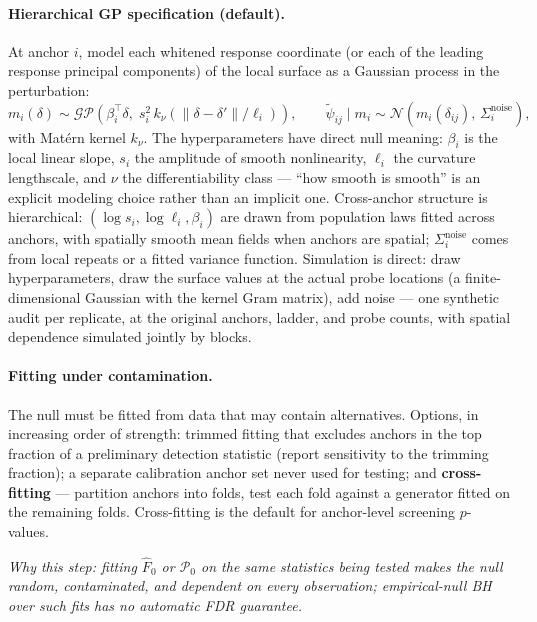 \documentclass[11pt]{article}
\newcommand{\nullgen}{\widehat{\mathcal P}_0}
\newcommand{\why}[1]{\par\noindent\textcolor{muted}{\small\itshape Why this step: #1}}
\begin{document}
\paragraph{Hierarchical GP specification (default).}
At anchor \(i\), model each whitened response coordinate (or each of the leading response
principal components) of the local surface as a Gaussian process in the perturbation:
\[
  m_i(\delta)\sim\mathcal{GP}\!\left(
    \beta_i^\top\delta,\;
    s_i^2\,k_\nu\!\left(\|\delta-\delta'\|/\ell_i\right)
  \right),
  \qquad
  \tilde\psi_{ij}\mid m_i \sim
  \mathcal N\!\left(m_i(\delta_{ij}),\,\Sigma_i^{\mathrm{noise}}\right),
\]
with Mat\'ern kernel \(k_\nu\). The hyperparameters have direct null meaning:
\(\beta_i\) is the local linear slope, \(s_i\) the amplitude of smooth nonlinearity,
\(\ell_i\) the curvature lengthscale, and \(\nu\) the differentiability class ---
``how smooth is smooth'' is an explicit modeling choice rather than an implicit one.
Cross-anchor structure is hierarchical: \((\log s_i,\log\ell_i,\beta_i)\) are drawn from
population laws fitted across anchors, with spatially smooth mean fields when anchors are
spatial; \(\Sigma_i^{\mathrm{noise}}\) comes from local repeats or a fitted variance
function. Simulation is direct: draw hyperparameters, draw the surface values at the actual
probe locations (a finite-dimensional Gaussian with the kernel Gram matrix), add noise ---
one synthetic audit per replicate, at the original anchors, ladder, and probe counts, with
spatial dependence simulated jointly by blocks.

\paragraph{Fitting under contamination.}
The null must be fitted from data that may contain alternatives. Options, in increasing order
of strength:
trimmed fitting that excludes anchors in the top fraction of a preliminary detection statistic
(report sensitivity to the trimming fraction);
a separate calibration anchor set never used for testing;
and \textbf{cross-fitting} --- partition anchors into folds, test each fold against a
generator fitted on the remaining folds. Cross-fitting is the default for anchor-level
screening $p$-values.
\why{fitting \(\widehat F_0\) or \(\nullgen\) on the same statistics being tested makes the
null random, contaminated, and dependent on every observation; empirical-null BH over such
fits has no automatic FDR guarantee.}
\end{document}
